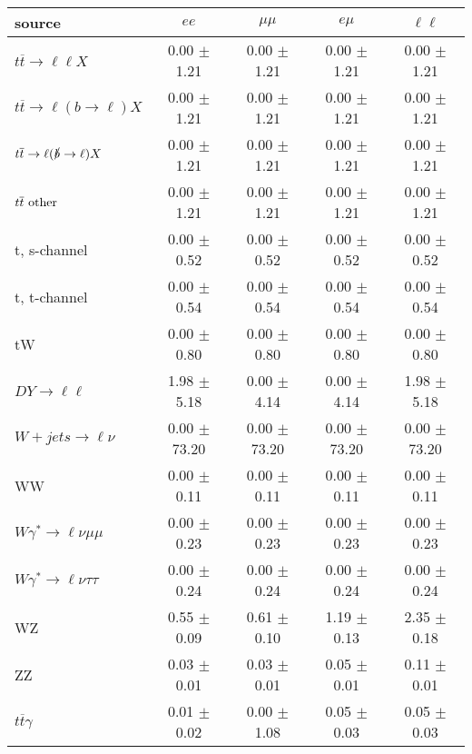 \begin{tabular}{l|cccc} \hline\hline
source & $ee$ & $\mu\mu$ & $e\mu$ & $\ell\ell $ \\
\hline
$t\overline{t} \rightarrow \ell \ell X$ &  0.00 $\pm$  1.21 &  0.00 $\pm$  1.21 &  0.00 $\pm$  1.21 &  0.00 $\pm$  1.21 \\
$t\overline{t} \rightarrow \ell (b \rightarrow \ell) X$ &  0.00 $\pm$  1.21 &  0.00 $\pm$  1.21 &  0.00 $\pm$  1.21 &  0.00 $\pm$  1.21 \\
$t\overline{t} \rightarrow \ell (\slashed b \rightarrow \ell) X$ &  0.00 $\pm$  1.21 &  0.00 $\pm$  1.21 &  0.00 $\pm$  1.21 &  0.00 $\pm$  1.21 \\
        $t\overline{t}\ \rm{other}$ &  0.00 $\pm$  1.21 &  0.00 $\pm$  1.21 &  0.00 $\pm$  1.21 &  0.00 $\pm$  1.21 \\
\hline
                       t, s-channel &  0.00 $\pm$  0.52 &  0.00 $\pm$  0.52 &  0.00 $\pm$  0.52 &  0.00 $\pm$  0.52 \\
                       t, t-channel &  0.00 $\pm$  0.54 &  0.00 $\pm$  0.54 &  0.00 $\pm$  0.54 &  0.00 $\pm$  0.54 \\
                                 tW &  0.00 $\pm$  0.80 &  0.00 $\pm$  0.80 &  0.00 $\pm$  0.80 &  0.00 $\pm$  0.80 \\
\hline
         $DY \rightarrow \ell \ell$ &  1.98 $\pm$  5.18 &  0.00 $\pm$  4.14 &  0.00 $\pm$  4.14 &  1.98 $\pm$  5.18 \\
      $W+jets \rightarrow \ell \nu$ &  0.00 $\pm$ 73.20 &  0.00 $\pm$ 73.20 &  0.00 $\pm$ 73.20 &  0.00 $\pm$ 73.20 \\
                                 WW &  0.00 $\pm$  0.11 &  0.00 $\pm$  0.11 &  0.00 $\pm$  0.11 &  0.00 $\pm$  0.11 \\
\hline
$W\gamma^{*} \rightarrow \ell \nu \mu\mu$ &  0.00 $\pm$  0.23 &  0.00 $\pm$  0.23 &  0.00 $\pm$  0.23 &  0.00 $\pm$  0.23 \\
$W\gamma^{*} \rightarrow \ell \nu \tau\tau$ &  0.00 $\pm$  0.24 &  0.00 $\pm$  0.24 &  0.00 $\pm$  0.24 &  0.00 $\pm$  0.24 \\
                                 WZ &  0.55 $\pm$  0.09 &  0.61 $\pm$  0.10 &  1.19 $\pm$  0.13 &  2.35 $\pm$  0.18 \\
                                 ZZ &  0.03 $\pm$  0.01 &  0.03 $\pm$  0.01 &  0.05 $\pm$  0.01 &  0.11 $\pm$  0.01 \\
\hline
              $t\overline{t}\gamma$ &  0.01 $\pm$  0.02 &  0.00 $\pm$  1.08 &  0.05 $\pm$  0.03 &  0.05 $\pm$  0.03 \\

\end{tabular}
